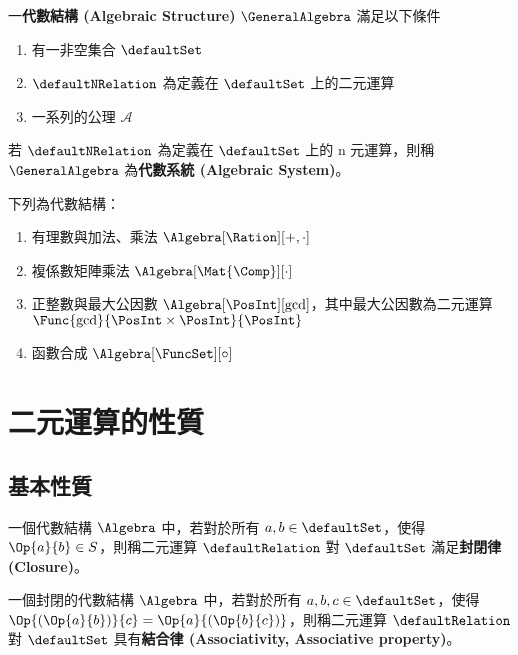 \documentclass[12pt,a4paper,oneside]{report}
\begin{document}
\begin{CJK}{UTF8}{bkai}
\begin{mydef}[代數結構與代數系統]
\label{def:algebra:algebraic_structure}
一\textbf{代數結構 (Algebraic Structure)} $\GeneralAlgebra$ 滿足以下條件
\begin{enumerate}
\item 有一非空集合 $\defaultSet$
\item $\defaultNRelation$ 為定義在 $\defaultSet$ 上的二元運算
\item 一系列的公理 $\mathcal{A}$
\end{enumerate}
若 $\defaultNRelation$ 為定義在 $\defaultSet$ 上的 n 元運算，則稱 $\GeneralAlgebra$ 為\textbf{代數系統 (Algebraic System)}。
\end{mydef}

\begin{myexample}下列為代數結構：
\begin{enumerate}
\item 有理數與加法、乘法 $\Algebra[\Ration][+,\cdot]$
\item 複係數矩陣乘法 $\Algebra[\Mat{\Comp}][\cdot]$
\item 正整數與最大公因數 $\Algebra[\PosInt][\gcd]$，其中最大公因數為二元運算 $\Func{\gcd}{\PosInt\times{\PosInt}}{\PosInt}$
\item 函數合成 $\Algebra[\FuncSet][\circ]$
\end{enumerate}
\end{myexample}

\section{二元運算的性質}
\subsection{基本性質}

\begin{mydef}[封閉律]
\label{def:algebra:closure}
一個代數結構 $\Algebra$ 中，若對於所有 $a,b\in{\defaultSet}$，使得 $\Op{a}{b}\in{S}$，則稱二元運算 $\defaultRelation$ 對 $\defaultSet$ 滿足\textbf{封閉律 (Closure)}。
\end{mydef}

\begin{mydef}[結合律]
\label{def:algebra:associativity}
一個封閉的代數結構 $\Algebra$ 中，若對於所有 $a,b,c\in{\defaultSet}$，使得 $\Op{(\Op{a}{b})}{c}=\Op{a}{(\Op{b}{c})}$，則稱二元運算 $\defaultRelation$ 對 $\defaultSet$ 具有\textbf{結合律 (Associativity, Associative property)}。
\end{mydef}


\end{CJK}
\end{document}
